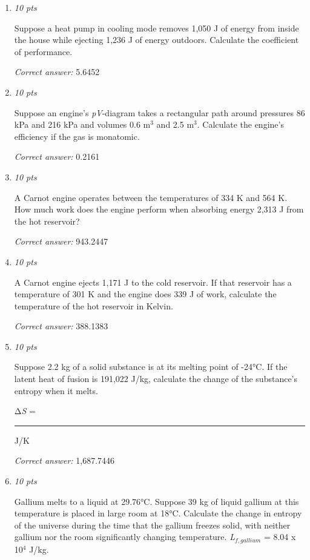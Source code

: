 \documentclass[11pt]{article}
\begin{document}
\begin{enumerate}[leftmargin=*,label=\textbf{Question \arabic*.}]
\item \hfill \textit{10 pts}

Suppose a heat pump in cooling mode removes 1,050 J of energy from inside the house while ejecting 1,236 J of energy outdoors. Calculate the coefficient of performance.

\textit{Correct answer:} 5.6452

\item \hfill \textit{10 pts}

Suppose an engine's \emph{pV}-diagram takes a rectangular path around pressures 86 kPa and 216 kPa and volumes 0.6 m$^{3}$ and 2.5 m$^{3}$. Calculate the engine's efficiency if the gas is monatomic.

\textit{Correct answer:} 0.2161

\item \hfill \textit{10 pts}

A Carnot engine operates between the temperatures of 334 K and 564 K. How much work does the engine perform when absorbing energy 2,313 J from the hot reservoir?

\textit{Correct answer:} 943.2447

\item \hfill \textit{10 pts}

A Carnot engine ejects 1,171 J to the cold reservoir. If that reservoir has a temperature of 301 K and the engine does 339 J of work, calculate the temperature of the hot reservoir in Kelvin.

\textit{Correct answer:} 388.1383

\item \hfill \textit{10 pts}

Suppose 2.2 kg of a solid substance is at its melting point of -24°C. If the latent heat of fusion is 191,022 J/kg, calculate the change of the substance's entropy when it melts.



Δ\emph{S} = \rule{2.5cm}{0.4pt}J/K

\textit{Correct answer:} 1,687.7446

\item \hfill \textit{10 pts}

Gallium melts to a liquid at 29.76°C. Suppose 39 kg of liquid gallium at this temperature is placed in large room at 18°C. Calculate the change in entropy of the universe during the time that the gallium freezes solid, with neither gallium nor the room significantly changing temperature. \emph{L}$_{f,gallium}$ = 8.04 x 10$^{4}$ J/kg.


\end{enumerate}
\end{document}
